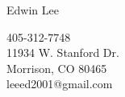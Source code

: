 \documentclass{res} %
\begin{document}

\begin{multicols}{2}
	{\Huge {Edwin Lee}}
	\vfill
	\columnbreak
	\begin{flushright}
		{405-312-7748}\\	
		{11934 W. Stanford Dr.}\\
		{Morrison, CO  80465}\\
		{leeed2001@gmail.com}
	\end{flushright}
\end{multicols}
\vspace{-0.45in}
\hrulefill
\vspace{-0.2in}
\end{document}
